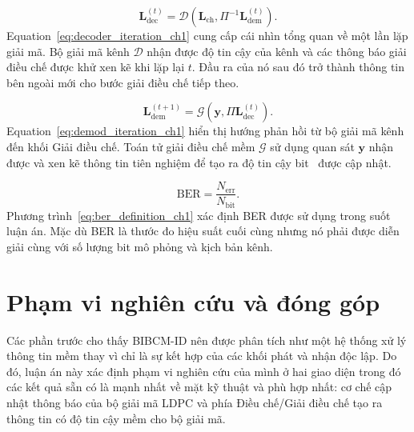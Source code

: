 \begin{equation}
\label{eq:decoder_iteration_ch1}
\mathbf{L}^{(t)}_{\mathrm{dec}}=
\mathcal{D}\!\left(\mathbf{L}_{\mathrm{ch}},\Pi^{-1}\mathbf{L}^{(t)}_{\mathrm{dem}}\right).
\end{equation}
Equation~\eqref{eq:decoder_iteration_ch1} cung cấp cái nhìn tổng quan về một lần lặp giải mã. Bộ giải mã kênh $\mathcal{D}$ nhận được độ tin cậy của kênh và các thông báo giải điều chế được khử xen kẽ khi lặp lại $t$. Đầu ra của nó sau đó trở thành thông tin bên ngoài mới cho bước giải điều chế tiếp theo.

\begin{equation}
\label{eq:demod_iteration_ch1}
\mathbf{L}^{(t+1)}_{\mathrm{dem}}=
\mathcal{G}\!\left(\mathbf{y},\Pi\mathbf{L}^{(t)}_{\mathrm{dec}}\right).
\end{equation}
Equation~\eqref{eq:demod_iteration_ch1} hiển thị hướng phản hồi từ bộ giải mã kênh đến khối Giải điều chế. Toán tử giải điều chế mềm $\mathcal{G}$ sử dụng quan sát $\mathbf{y}$ nhận được và xen kẽ thông tin tiên nghiệm để tạo ra độ tin cậy bit~ được cập nhật.

\begin{equation}
\label{eq:ber_definition_ch1}
\mathrm{BER}=\frac{N_{\mathrm{err}}}{N_{\mathrm{bit}}}.
\end{equation}
Phương trình~\eqref{eq:ber_definition_ch1} xác định BER được sử dụng trong suốt luận án. Mặc dù BER là thước đo hiệu suất cuối cùng nhưng nó phải được diễn giải cùng với số lượng bit mô phỏng và kịch bản kênh.

\section{Phạm vi nghiên cứu và đóng góp}
Các phần trước cho thấy BIBCM-ID nên được phân tích như một hệ thống xử lý thông tin mềm thay vì chỉ là sự kết hợp của các khối phát và nhận độc lập. Do đó, luận án này xác định phạm vi nghiên cứu của mình ở hai giao diện trong đó các kết quả sẵn có là mạnh nhất về mặt kỹ thuật và phù hợp nhất: cơ chế cập nhật thông báo của bộ giải mã LDPC và phía Điều chế/Giải điều chế tạo ra thông tin có độ tin cậy mềm cho bộ giải mã.

